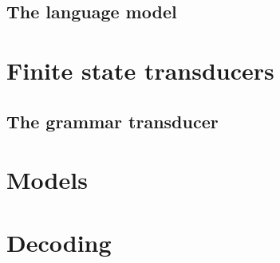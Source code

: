 \documentclass[12pt]{article}
\begin{document}
\subsection{The language model}\label{LM}


\section{Finite state transducers}\label{fst}

\subsection{The grammar transducer}

\section{Models}\label{model}
\section{Decoding}\label{decode}



\end{document}
